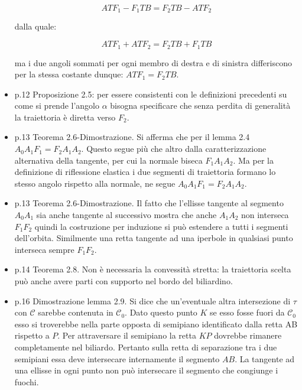 \documentclass[10pt,a4paper]{article}
\begin{document}
\begin{itemize}
\begin{equation}
ATF_1 - F_1TB = F_2TB-ATF_2
\end{equation}

dalla quale:

\begin{equation}
ATF_1 + ATF_2 = F_2TB + F_1TB
\end{equation}

ma i due angoli sommati per ogni membro di destra e di sinistra differiscono per la stessa costante dunque: $ATF_1 = F_2TB$.

\item p.12 Proposizione 2.5: per essere consistenti con le definizioni precedenti su come si prende l'angolo $\alpha$ bisogna specificare che senza perdita di generalità la traiettoria è diretta verso $F_2$.
 
\item p.13 Teorema 2.6-Dimostrazione. Si afferma che per il lemma 2.4 $A_0A_1F_1 = F_2A_1A_2$. Questo segue più che altro dalla caratterizzazione alternativa della tangente, per cui la normale biseca $F_1 A_1 A_2$. Ma per la definizione di riflessione elastica i due segmenti di traiettoria formano lo stesso angolo rispetto alla normale, ne segue $A_0A_1F_1 = F_2A_1A_2$.

\item p.13 Teorema 2.6-Dimostrazione. Il fatto che l'ellisse tangente al segmento $A_0 A_1$ sia anche tangente al successivo mostra che anche $A_1 A_2$ non interseca $F_1 F_2$ quindi la costruzione per induzione si può estendere a tutti i segmenti dell'orbita. Similmente una retta tangente ad una iperbole in qualsiasi punto interseca sempre $F_1 F_2$.

\item p.14 Teorema 2.8. Non è necessaria la convessità stretta: la traiettoria scelta può anche avere parti con supporto nel bordo del biliardino.

\item p.16 Dimostrazione lemma 2.9. Si dice che un'eventuale altra intersezione di $\tau$ con $\mathcal{C}$ sarebbe contenuta in $\mathcal{C_0}$. Dato questo punto $K$ se esso fosse fuori da $\mathcal{C_0}$ esso si troverebbe nella parte opposta di semipiano identificato dalla retta AB rispetto a $P$. Per attraversare il semipiano la retta $KP$ dovrebbe rimanere completamente nel biliardo. Pertanto sulla retta di separazione tra i due semipiani essa deve intersecare internamente il segmento $AB$. La tangente ad una ellisse in ogni punto non può intersecare il segmento che congiunge i fuochi.


\end{itemize}
\end{document}

